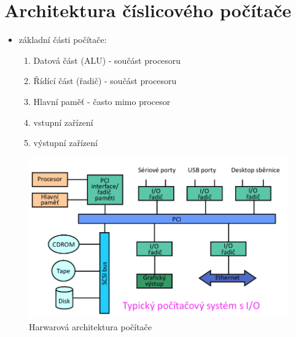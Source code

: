 \documentclass{szzclass}
\providecommand{\tightlist}{%
  \setlength{\itemsep}{0pt}\setlength{\parskip}{0pt}}
\begin{document}
\tableofcontents
\newpage

\hypertarget{architektura-ux10duxedslicovuxe9ho-poux10duxedtaux10de}{%
\section{Architektura číslicového
počítače}\label{architektura-ux10duxedslicovuxe9ho-poux10duxedtaux10de}}

\begin{itemize}
\tightlist
\item
  základní části počítače:

  \begin{enumerate}
  \def\labelenumi{\arabic{enumi}.}
  \tightlist
  \item
    Datová část (ALU) - součást procesoru
  \item
    Řídící část (řadič) - součást procesoru
  \item
    Hlavní paměť - často mimo procesor
  \item
    vstupní zařízení
  \item
    výstupní zařízení
  \end{enumerate}
\end{itemize}

\begin{figure}[h]
\centering
\includegraphics[width=\textwidth]{topics/bi-spol-28/images/hw_architektura.png}
\caption{Harwarová architektura počítače}
\end{figure}
\end{document}
